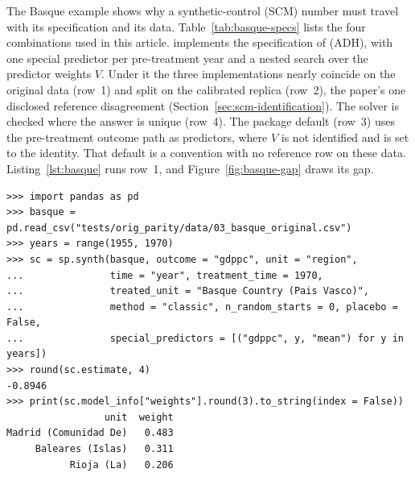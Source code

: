 The Basque example \citep{abadie2003economic} shows why a synthetic-control
(SCM) number must travel with its specification and its data.
Table~\ref{tab:basque-specs} lists the four combinations used in this
article.  implements the specification of
\citet{abadie2010synthetic} (ADH), with one special predictor per
pre-treatment year and a nested search over the predictor weights \(V\).
Under it the three implementations nearly coincide on the original data
(row~1) and split on the calibrated replica (row~2), the paper's one
disclosed reference disagreement (Section~\ref{sec:scm-identification}).
The solver is checked where the answer is unique (row~4). The package
default (row~3) uses the pre-treatment outcome path as predictors, where
\(V\) is not identified and is set to the identity. That default is a
convention with no reference row on these data.
Listing~\ref{lst:basque} runs row~1, and Figure~\ref{fig:basque-gap} draws
its gap.

\begin{lstlisting}[caption={The ADH specification on the original
\code{Synth::basque} data (row~1 of Table~\ref{tab:basque-specs}): one
special predictor per pre-treatment year, a single deterministic start for
the search over \(V\), and no placebo runs.},label={lst:basque},captionpos=b]
>>> import pandas as pd
>>> basque = pd.read_csv("tests/orig_parity/data/03_basque_original.csv")
>>> years = range(1955, 1970)
>>> sc = sp.synth(basque, outcome = "gdppc", unit = "region",
...               time = "year", treatment_time = 1970,
...               treated_unit = "Basque Country (Pais Vasco)",
...               method = "classic", n_random_starts = 0, placebo = False,
...               special_predictors = [("gdppc", y, "mean") for y in years])
>>> round(sc.estimate, 4)
-0.8946
>>> print(sc.model_info["weights"].round(3).to_string(index = False))
                 unit  weight
Madrid (Comunidad De)   0.483
     Baleares (Islas)   0.311
           Rioja (La)   0.206
\end{lstlisting}

